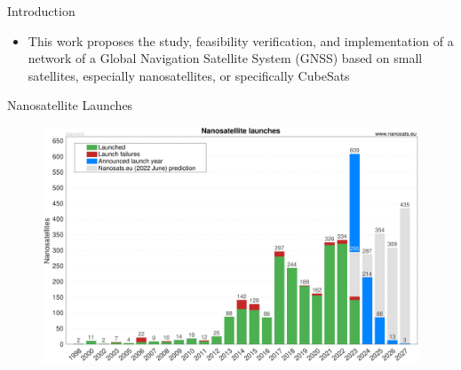%
%
%
%
%

%
%
%
%
%

\begin{frame}{Introduction}

    \begin{itemize}
        \item This work proposes the study, feasibility verification, and implementation of a network of a Global Navigation Satellite System (GNSS) based on small satellites, especially nanosatellites, or specifically CubeSats
    \end{itemize}

\end{frame}

\begin{frame}{Nanosatellite Launches}

    \begin{figure}[!ht]
        \begin{center}
            \includegraphics[width=0.9\columnwidth]{figures/Nanosats_years_2023-05-31}
        \end{center}
    \end{figure}

\end{frame}

